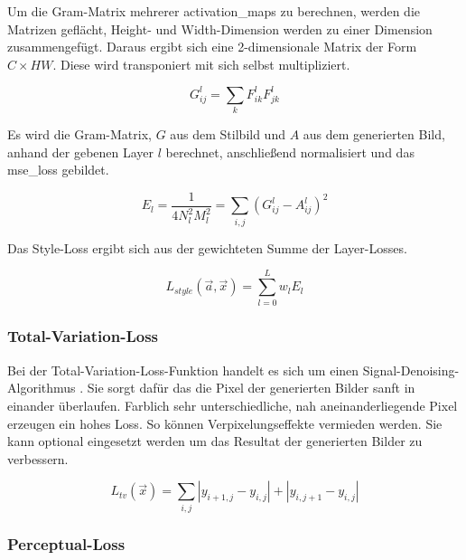 Um die Gram-Matrix mehrerer \gls{activation_map}s zu berechnen, werden die Matrizen geflächt, Height- und Width-Dimension werden zu einer Dimension zusammengefügt. Daraus ergibt sich eine 2-dimensionale Matrix der Form $ C \times HW $. Diese wird transponiert mit sich selbst multipliziert.

\begin{equation}
	\label{eq:gram_matrix_1}
	G_{ij}^{l} = \sum_{k} F_{ik}^{l} F_{jk}^{l}
\end{equation}

Es wird die Gram-Matrix, $ G $ aus dem Stilbild und $ A $ aus dem generierten Bild, anhand der gebenen Layer $ l $ berechnet, anschließend normalisiert und das \gls{mse_loss} gebildet.

\begin{equation}
	\label{eq:gram_matrix_2}
	E_{l} = \frac{1}{4N_{l}^{2} M_{l}^2} = \sum_{i, j} ( G_{ij}^{l} - A_{ij}^{l} )^2
\end{equation}

Das Style-Loss ergibt sich aus der gewichteten Summe der Layer-Losses.

\begin{equation}
	\label{eq:style_loss}
	L_{style} ( \vec{a}, \vec{x} ) = \sum_{l=0}^{L} w_{l} E_{l}
\end{equation}

\subsubsection{Total-Variation-Loss}
\label{sec:total_variation_Loss}

Bei der Total-Variation-Loss-Funktion handelt es sich um einen Signal-Denoising-Algorithmus \cite{RUDIN1992259, DBLP:journals/corr/EstrelaMS16}. Sie sorgt dafür das die Pixel der generierten Bilder sanft in einander überlaufen. Farblich sehr unterschiedliche, nah aneinanderliegende Pixel erzeugen ein hohes Loss. So können Verpixelungseffekte vermieden werden. Sie kann optional eingesetzt werden um das Resultat der generierten Bilder zu verbessern.

\begin{equation}
	\label{eq:total_variation_loss}
	L_{tv} ( \vec{x} ) = \sum_{i,j} | y_{i + 1, j} - y_{i, j} | + | y_{i, j + 1} - y_{i,j} |
\end{equation}

\subsubsection{Perceptual-Loss}
\label{sec:perceptual_loss}

